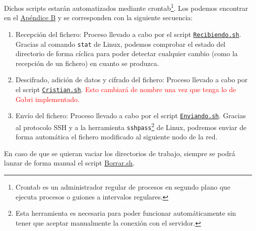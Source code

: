 Dichos scripts estarán automatizados mediante crontab\footnote{Crontab es un administrador regular de procesos en segundo plano que ejecuta procesos o guiones a intervalos regulares.}. Los podemos encontrar en el \hyperlink{Scripts}{Apéndice B} y se corresponden con la siguiente secuencia:
\begin{enumerate}
	\item Recepción del fichero: Proceso llevado a cabo por el script \hyperlink{ScriptRecibiendo}{\texttt{Recibiendo.sh}}. Gracias al comando \texttt{stat} de Linux, podemos comprobar el estado del directorio de forma cíclica para poder detectar cualquier cambio (como la recepción de un fichero) en cuanto se produzca.
	\item Descifrado, adición de datos y cifrado del fichero: Proceso llevado a cabo por el script \hyperlink{ScriptCristian}{\texttt{Cristian.sh}}. \textcolor{red}{Esto cambiará de nombre una vez que tenga lo de Gabri implementado.}
	\item Envío del fichero: Proceso llevado a cabo por el script \hyperlink{ScriptEnviando}{\texttt{Enviando.sh}}. Gracias al protocolo SSH y a la herramienta \texttt{sshpass}\footnote{Esta herramienta es necesaria para poder funcionar automáticamente sin tener que aceptar manualmente la conexión con el servidor.} de Linux, podremos enviar de forma automática el fichero modificado al siguiente nodo de la red.
\end{enumerate}

En caso de que se quieran vaciar los directorios de trabajo, siempre se podrá lanzar de forma manual el script \hyperlink{ScriptBorrar}{Borrar.sh}.